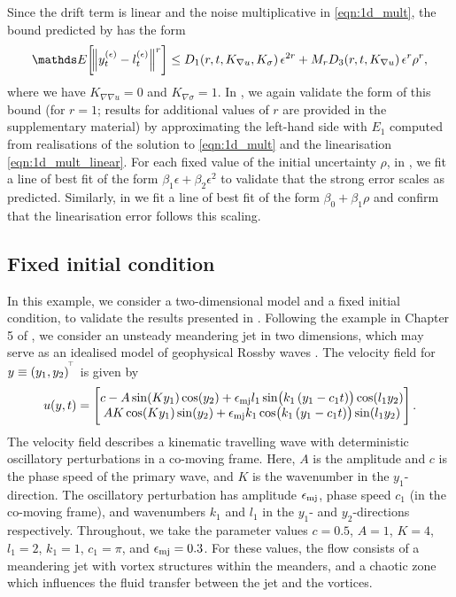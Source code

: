 Since the drift term is linear and the noise multiplicative in \cref{eqn:1d_mult}, the bound predicted by  has the form
\[
	\avg{\norm{y_t^{(\epsilon)} - l_t^{(\epsilon)}}^r} \leq D_1\!\left(r,t, K_{\nabla u}, K_\sigma\right)\epsilon^{2r} + M_{r}D_3\!\left(r,t, K_{\nabla u}\right)\epsilon^r\rho^{r},
\]
where we have \(K_{\nabla\nabla u} = 0\) and \(K_{\nabla\sigma} = 1\).
In , we again validate the form of this bound (for \(r = 1\); results for additional values of \(r\) are provided in the supplementary material) by approximating the left-hand side with \(E_1\) computed from realisations of the solution to \cref{eqn:1d_mult} and the linearisation \cref{eqn:1d_mult_linear}.
For each fixed value of the initial uncertainty \(\rho\), in , we fit a line of best fit of the form \(\beta_1 \epsilon + \beta_2 \epsilon^2\) to validate that the strong error scales as predicted.
Similarly, in  we fit a line of best fit of the form \(\beta_0 + \beta_1 \rho\) and confirm that the linearisation error follows this scaling.


\subsection{Fixed initial condition}\label{sec:numerics_2d}
In this example, we consider a two-dimensional model and a fixed initial condition, to validate the results presented in .
Following the example in Chapter 5 of \citet{SamelsonWiggins_2006_LagrangianTransportGeophysical}, we consider an unsteady meandering jet in two dimensions, which may serve as an idealised model of geophysical Rossby waves \citep{Pierrehumbert_1991_ChaoticMixingTracer}.
The velocity field for \(y \equiv \left(y_1, y_2\right)^{^{\!\top}}\) is given by
\begin{equation}
	u\!\left(y, t\right) = \begin{bmatrix}
		c - A\sin\!\left(Ky_1\right)\cos\!\left(y_2\right) + \oldepsilon_{\mathrm{mj}} l_1\sin\!\left(k_1\left(y_1 - c_1 t\right)\right)\cos\!\left(l_1 y_2\right) \\
		AK\cos\!\left(Ky_1\right)\sin\!\left(y_2\right) + \oldepsilon_{\mathrm{mj}} k_1\cos\!\left(k_1\left(y_1 - c_1t\right)\right)\sin\!\left(l_1 y_2\right)
	\end{bmatrix}.
	\label{eqn:jet_ex}
\end{equation}
The velocity field describes a kinematic travelling wave with deterministic oscillatory perturbations in a co-moving frame.
Here, \(A\) is the amplitude and \(c\) is the phase speed of the primary wave, and \(K\) is the wavenumber in the \(y_1\)-direction.
The oscillatory perturbation has amplitude \(\epsilon_{\mathrm{mj}}\), phase speed \(c_1\) (in the co-moving frame), and wavenumbers \(k_1\) and \(l_1\) in the \(y_1\)- and \(y_2\)-directions respectively.
Throughout, we take the parameter values \(c = 0.5\), \(A = 1\), \(K = 4\), \(l_1 = 2\), \(k_1 = 1\), \(c_1 = \pi\), and \(\epsilon_{\mathrm{mj}} = 0.3\).
For these values, the flow consists of a meandering jet with vortex structures within the meanders, and a chaotic zone which influences the fluid transfer between the jet and the vortices.

